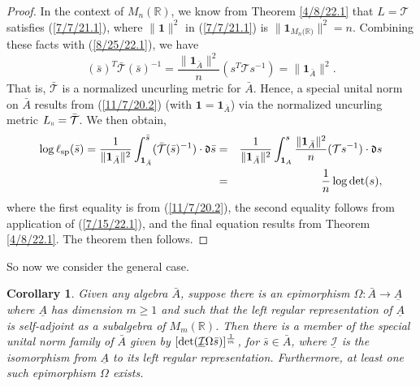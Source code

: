 \documentclass{amsart}
\numberwithin{equation}{section}
\newtheorem{corollary}[theorem]{Corollary}
\theoremstyle{definition}
\numberwithin{theorem}{section}
\begin{document}
\begin{proof}
In the context of $M_n(\mathbb{R})$, we know from Theorem \ref{4/8/22.1} that $L=\mathcal{T}$ satisfies (\ref{7/7/21.1}), where $\|\mathbf{1}\|^2$ in  (\ref{7/7/21.1}) is $\|\mathbf{1}_{M_n({\mathbb{R})}}\|^2 = n$.  Combining these facts with (\ref{8/25/22.1}), we have \begin{equation}\label{9/27/23.1} (\bar{s})^T \bar{\mathcal{T}} (\bar{s})^{-1} = \frac{\|\mathbf{1}_{\bar{A}}\|^2}{n}( s^T \mathcal{T} s^{-1}) = \|\mathbf{1}_{\bar{A}}\|^2 .\end{equation} 
That is, $\mathcal{\bar{T}}$ is a normalized uncurling metric for $\bar{A}$.  Hence, a special unital norm on $\bar{A}$ results from (\ref{11/7/20.2}) (with $\mathbf{1}=\mathbf{1}_{\bar{A}}$)  via the normalized uncurling metric $L_{\shortparallel} = \bar{\mathcal{T}}$.  
  We then obtain, 
\begin{eqnarray}\nonumber \log\ell_{\rm sp}(\bar{s}) = \frac{1}{\|\mathbf{1}_{\bar{A}}\|^2} \int_{\mathbf{1}_{\bar{A}}}^{\bar{s}} (\bar{\mathcal{T}}(\bar{s})^{-1})\cdot \mathfrak{d}\bar{s}
 &=& \frac{1}{\|\mathbf{1}_{\bar{A}}\|^2} \int_{\mathbf{1}_{A}}^{s} \frac{\|\mathbf{1}_{\bar{A}}\|^2}{n}(\mathcal{T}s^{-1})\cdot \mathfrak{d}s \\ &=& \frac{1}{n} \log\text{det}(s),\label{9/27/23.2}\end{eqnarray} where the first equality is from (\ref{11/7/20.2}), the second equality follows from application of (\ref{7/15/22.1}), and the final equation results from Theorem \ref{4/8/22.1}.
The theorem then follows. 
 \end{proof} 
 

So now we consider the general case.
 
  \begin{corollary}\label{11/17/22.1}
  Given any algebra $\bar{A}$, suppose there is an epimorphism $\Omega:\bar{A}\rightarrow \underline{A}$ where $ \underline{A}$ has dimension $m\ge 1$ and such that the left regular representation of $\underline{A}$ is self-adjoint as a subalgebra of $M_m(\mathbb{R})$.  Then there is a member of the special unital norm family of  $\bar{A}$ given by $[{\rm det}(\underline{\mathcal{I}}\Omega \bar{s})]^{\frac{1}{m}}$, for $\bar{s}\in\bar{A}$, where $\underline{\mathcal{I}}$ is the isomorphism from $\underline{A}$ to its left regular representation.  Furthermore, at least one such epimorphism $\Omega$ exists. 
   \end{corollary}
 
\end{document}
